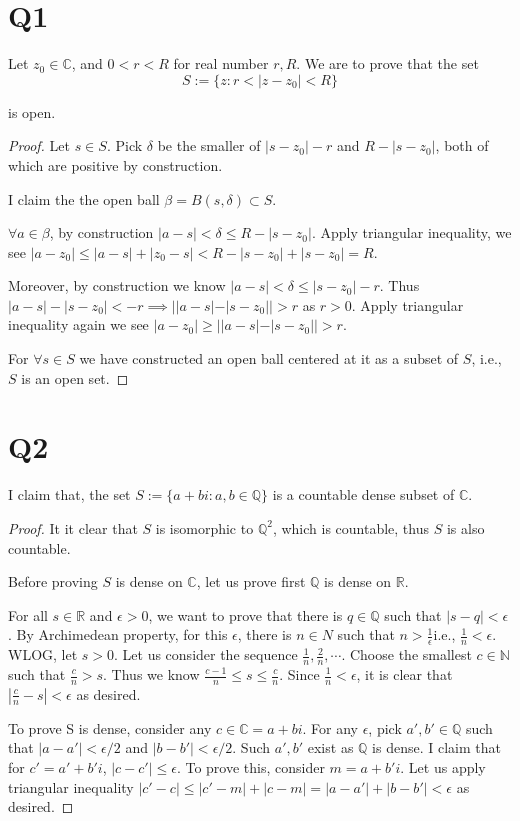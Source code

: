 \documentclass[12pt, a4paper]{article}
\theoremstyle{definition}
\theoremstyle{remark}
\newcommand{\bb}[1]{\mathbb{#1}}
\begin{document}
\section{Q1}

Let $z_0 \in \bb{C}$, and $0 < r < R$ for real number $r, R$. We are to prove that the set 
$$
S := \{z : r<|z-z_0|< R \}
$$

is open.

\begin{proof}
Let $s \in S$. Pick $\delta$ be the smaller of $|s-z_0| -r $ and $R - |s-z_0|$, both of which are positive by construction.

I claim the the open ball $\beta = B(s, \delta) \subset S$. 

$\forall a \in \beta$, by construction $|a-s| < \delta  \leq R - |s-z_0|$. Apply triangular inequality, we see $|a-z_0| \leq |a-s| + |z_0-s| < R - |s-z_0| + |s-z_0| = R$.

Moreover, by construction we know $| a-s | < \delta \leq |s - z_0| - r$. Thus $|a-s| - |s-z_0| < - r \implies ||a-s| - |s-z_0|| > r$ as $r > 0$. Apply triangular inequality again we see $|a-z_0| \geq | |a-s| - |s-z_0| | > r$.

For $\forall s \in S$ we have constructed an open ball centered at it as a subset of $S$, i.e., $S$ is an open set.
\end{proof}

\section{Q2}

I claim that, the set $S := \{a + bi : a, b \in \bb{Q}\}$ is a countable dense subset of $\bb{C}$.

\begin{proof}
It it clear that $S$ is isomorphic to $\bb{Q}^2$, which is countable, thus $S$ is also countable.

Before proving $S$ is dense on $\bb{C}$, let us prove first $\bb{Q}$ is dense on $\bb{R}$.

For all $s\in \bb{R}$ and $\epsilon > 0$, we want to prove that there is $q \in \bb{Q}$ such that $|s-q| < \epsilon$.
By Archimedean property, for this $\epsilon$, there is $n \in N$ such that $n > \frac{1}{\epsilon} $i.e., $ \frac{1}{n} < \epsilon$. 
WLOG, let $s > 0$.
Let us consider the sequence $\frac{1}{n}, \frac{2}{n}, \cdots$. Choose the smallest $c \in \bb{N}$ such that $\frac{c}{n} > s$. 
Thus we know $\frac{c-1}{n} \leq s \leq \frac{c}{n}$. Since $\frac{1}{n} < \epsilon$, it is clear that $|\frac{c}{n} - s| < \epsilon$ as desired.

To prove S is dense, consider any $c \in \bb{C} = a + bi$. For any $\epsilon$, pick $a', b' \in \bb{Q}$ such that $|a-a'| < \epsilon /2$ and $|b-b'| < \epsilon/2$. 
Such $a', b'$ exist as $\bb{Q}$ is dense. I claim that for $c' = a' + b'i$, $|c - c'| \leq \epsilon$. To prove this, consider $m = a + b'i$. 
Let us apply triangular inequality $|c' - c| \leq |c' - m| + |c - m | = |a-a'| + |b-b'| < \epsilon$ as desired.

\end{proof}
\end{document}
